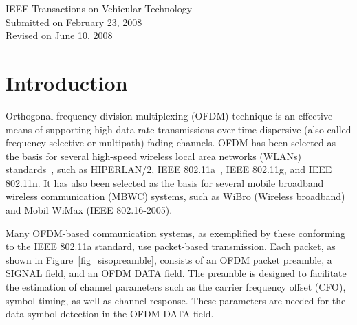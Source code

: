 \documentclass[11pt,draftnofoot,onecolumn]{IEEEtran}
\def\spacingset#1{\def\baselinestretch{#1}\small\normalsize}
\begin{document}
\begin{center}
IEEE Transactions on Vehicular Technology\\
Submitted on February 23, 2008\\
Revised on June 10, 2008
\end{center}

\newpage

\spacingset{1.7}



\section{Introduction}

Orthogonal frequency-division multiplexing (OFDM) technique is an
effective means of supporting high data rate transmissions over
time-dispersive (also called frequency-selective or multipath)
fading channels. OFDM has been selected as the basis for several
high-speed wireless local area networks (WLANs) 
standards~\cite{NeeAwaterMorikura1999}, such as HIPERLAN/2, 
IEEE 802.11a~\cite{IEEEstandardOFDM1999}, 
IEEE 802.11g, and IEEE 802.11n. It has
also been selected as the basis for several mobile broadband
wireless communication (MBWC) systems, such as WiBro (Wireless
broadband) and Mobil WiMax (IEEE 802.16-2005).

Many OFDM-based communication systems, as exemplified by these
conforming to the IEEE 802.11a standard, use packet-based transmission.
Each packet, as shown in Figure~\ref{fig_sisopreamble}, consists of
an OFDM packet preamble, a SIGNAL field, and an OFDM DATA field. The
preamble is designed to facilitate the estimation of channel
parameters such as the carrier frequency offset (CFO), symbol
timing, as well as channel response. These parameters are needed for
the data symbol
detection in the OFDM DATA field.%

\end{document}
